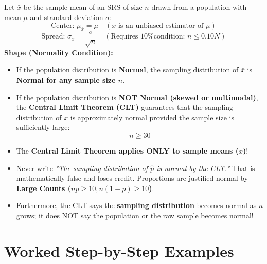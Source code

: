 \begin{lessonbox}
Let $\bar{x}$ be the sample mean of an SRS of size $n$ drawn from a population with mean $\mu$ and standard deviation $\sigma$:
\begin{equation}
  \text{Center: } \mu_{\bar{x}} = \mu \quad (\bar{x} \text{ is an unbiased estimator of } \mu)
\end{equation}
\begin{equation}
  \text{Spread: } \sigma_{\bar{x}} = \frac{\sigma}{\sqrt{n}} \quad (\text{Requires 10\% condition: } n \le 0.10N)
\end{equation}
\textbf{Shape (Normality Condition):}
\begin{itemize}[leftmargin=1.2em]
  \item If the population distribution is \textbf{Normal}, the sampling distribution of $\bar{x}$ is \textbf{Normal for any sample size $n$}.
  \item If the population distribution is \textbf{NOT Normal (skewed or multimodal)}, the \textbf{Central Limit Theorem (CLT)} guarantees that the sampling distribution of $\bar{x}$ is approximately normal provided the sample size is sufficiently large:
  \begin{equation}
    n \ge 30
  \end{equation}
\end{itemize}
\end{lessonbox}

\begin{trapbox}
\begin{itemize}[leftmargin=1.2em]
  \item The \textbf{Central Limit Theorem applies ONLY to sample means ($\bar{x}$)}!
  \item Never write \textit{"The sampling distribution of $\hat{p}$ is normal by the CLT."} That is mathematically false and loses credit. Proportions are justified normal by \textbf{Large Counts ($np \ge 10, n(1-p) \ge 10$)}.
  \item Furthermore, the CLT says the \textbf{sampling distribution} becomes normal as $n$ grows; it does NOT say the population or the raw sample becomes normal!
\end{itemize}
\end{trapbox}

\section{Worked Step-by-Step Examples}

